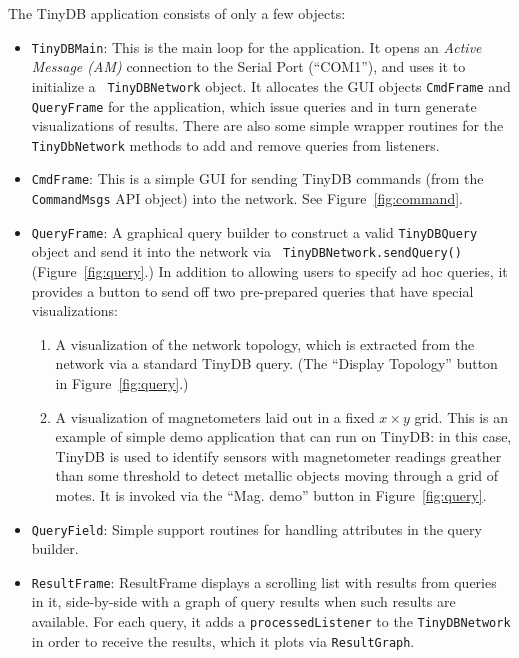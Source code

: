 \documentclass[11pt]{article}
\begin{document}
The TinyDB application consists of only a few objects:
\begin{itemize}
\item {\tt TinyDBMain}: This is the main loop for the application.  It
  opens an {\em Active Message (AM)} connection to
  the Serial Port (``COM1''), and uses it to initialize a {\tt
  TinyDBNetwork} object.  It
  allocates the GUI objects {\tt CmdFrame} and {\tt QueryFrame} for
  the application, which issue queries and in turn generate visualizations
  of results.  There are also some simple wrapper routines for
  the {\tt TinyDbNetwork} methods to add and remove queries from listeners.

\item {\tt CmdFrame}: This is a simple GUI for sending TinyDB commands
  (from the {\tt CommandMsgs} API object) into the network.  See Figure~\ref{fig:command}.

\item {\tt QueryFrame}: A graphical query builder to construct a valid
  {\tt TinyDBQuery} object and send it into the network via {\tt
  TinyDBNetwork.sendQuery()} (Figure~\ref{fig:query}.)  In addition to
  allowing users to specify ad hoc queries, it provides a button to
  send off two pre-prepared queries that have special visualizations:
  \begin{enumerate}
  \item A visualization of the network topology, which is extracted
  from the network via a standard TinyDB query. (The ``Display
  Topology'' button in Figure~\ref{fig:query}.)
  \item A visualization of magnetometers laid out in a fixed $x \times
  y$ grid. This is an example of simple demo application that can run on
  TinyDB:  in this case, TinyDB is used to identify sensors with 
  magnetometer readings greather than some threshold to detect metallic
  objects moving through a grid of motes. It is invoked via the ``Mag. demo'' button in Figure~\ref{fig:query}.

  \end{enumerate}
  
\item {\tt QueryField}: Simple support routines for handling
attributes in the query builder.

\item {\tt ResultFrame}: ResultFrame displays a scrolling list with
    results from queries in it, side-by-side with a graph of query
    results when such results are available.  For each query, it adds
    a {\tt processedListener} to the {\tt TinyDBNetwork} in order to
    receive the results, which it plots via {\tt ResultGraph}.


\end{itemize}
\end{document}

